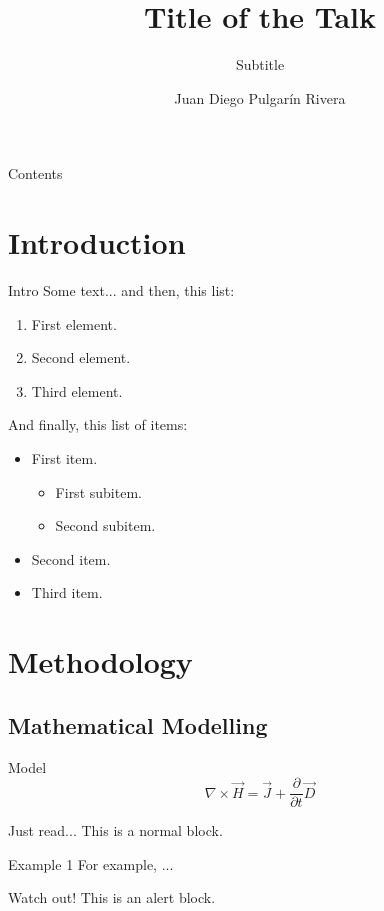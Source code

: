 \documentclass[hideothersubsections]{beamer}
\title{Title of the Talk}
\subtitle{Subtitle}
\author{Juan Diego Pulgarín Rivera}
\institute{The School of Life}
\begin{document}
\begin{frame}[plain]
\titlepage
\end{frame}

\begin{frame}[plain]{Contents}
	\tableofcontents
\end{frame}

\section{Introduction}
\begin{frame}{Intro}
	Some text... and then, this list:
	\begin{enumerate}
		\item First element.
		\item Second element.
		\item Third element.
	\end{enumerate}
	
	And finally, this list of items:
	\begin{itemize}
		\item First item.
		\begin{itemize}
			\item First subitem.
			\item Second subitem.
		\end{itemize}
		\item Second item.
		\item Third item.
	\end{itemize}
\end{frame}

\section{Methodology}
\subsection{Mathematical Modelling}
\begin{frame}{Model}
	\begin{equation}
		\nabla\times\vec{H} = \vec{J} + \frac{\partial}{\partial t} \vec{D}
	\end{equation}
	\begin{block}{Just read...}
		This is a normal block.
	\end{block}
	\begin{exampleblock}{Example 1}
		For example, ... 
	\end{exampleblock}
	\begin{alertblock}{Watch out!}
		This is an alert block.
	\end{alertblock}
\end{frame}
\end{document}
